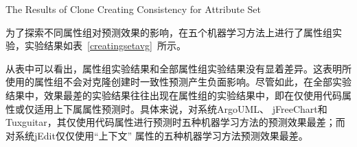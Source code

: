 
{The Results of Clone Creating Consistency for Attribute Set}

为了探索不同属性组对预测效果的影响，在五个机器学习方法上进行了属性组实验，实验结果如表~\ref{creatingsetavg}~所示。

从表中可以看出，属性组实验结果和全部属性组实验结果没有显着差异。这表明所使用的属性组不会对克隆创建时一致性预测产生负面影响。尽管如此，在全部实验结果中，效果最差的实验结果往往出现在属性组的实验结果中，即在仅使用代码属性或仅适用上下属属性预测时。具体来说，对系统ArgoUML、 jFreeChart和 Tuxguitar，其仅使用代码属性进行预测时五种机器学习方法的预测效果最差；而对系统jEdit仅仅使用“上下文” 属性的五种机器学习方法预测效果最差。

